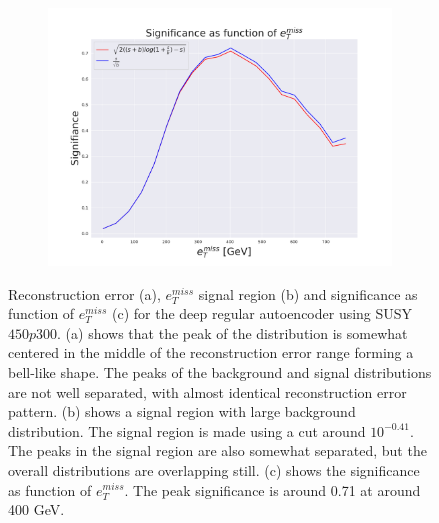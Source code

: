 \begin{figure}[H]
    \hfill 
    \begin{subfigure}{.40\textwidth}
        \includegraphics[width=\textwidth]{Figures/VAE_testing/big/2lep/significance_etmiss_450p0p0300_-0.40609370505539655.pdf}
        \caption{}
        \label{fig:VAE_2lep_big_signi_450_3}
    \end{subfigure}
    \hfill      
    \caption[2lep deep network | $450p300$ | VAE | 3]{Reconstruction error (a), $e_T^{miss}$ signal region (b) and significance as function of 
    $e_T^{miss}$ (c) for the deep regular autoencoder using SUSY $450p300$. 
    (a) shows that the peak of the distribution is somewhat centered in the middle 
    of the reconstruction error range forming a bell-like shape. The peaks of the background and signal 
    distributions are not well separated, with almost identical reconstruction error pattern. (b) 
    shows a signal region with large background distribution. The signal region is made using a cut around
    $10^{-0.41}$. The peaks in the signal region are also somewhat 
    separated, but the overall distributions are overlapping still. 
    (c) shows the significance as function of $e_T^{miss}$. 
    The peak significance is around 0.71 at around 400 GeV.}
    \label{fig:VAE_2lep_big_rec_sig_signi_450_3}
\end{figure}

